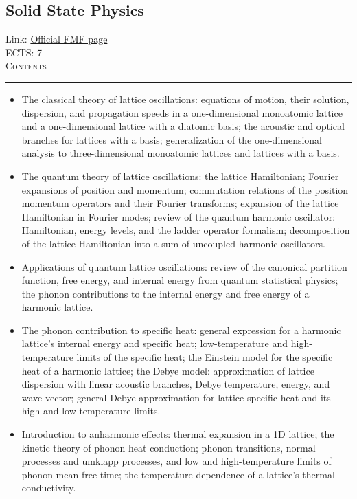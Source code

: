 \documentclass[11pt, a4paper]{article}
\newenvironment{course}[3]{
\subsection{#1}%
Link: \href{#2}{Official FMF page}\\%
ECTS: #3%
\vspace{1ex}
\\
{\large \textsc{Contents}}\\[-0.9ex]%
\rule{\textwidth}{0.5pt}
\vspace{-3ex}
}
{}
\newenvironment{chapter}[1]{
\begin{tcolorbox}[title=#1, breakable]
}
{\end{tcolorbox}}
\begin{document}
\begin{course}{Solid State Physics}{https://www.fmf.uni-lj.si/en/study-physics/programmes/1fiz/2020/7000777/courses/1138/}{7}
    \begin{chapter}{Lattice oscillations}
        \begin{itemize}
        
            \item The classical theory of lattice oscillations: equations of motion, their solution, dispersion, and propagation speeds in a one-dimensional monoatomic lattice and a one-dimensional lattice with a diatomic basis; the acoustic and optical branches for lattices with a basis; generalization of the one-dimensional analysis to three-dimensional monoatomic lattices and lattices with a basis.

            \item The quantum theory of lattice oscillations: the lattice Hamiltonian; Fourier expansions of position and momentum; commutation relations of the position momentum operators and their Fourier transforms; expansion of the lattice Hamiltonian in Fourier modes; review of the quantum harmonic oscillator: Hamiltonian, energy levels, and the ladder operator formalism; decomposition of the lattice Hamiltonian into a sum of uncoupled harmonic oscillators.

            \item Applications of quantum lattice oscillations: review of the canonical partition function, free energy, and internal energy from quantum statistical physics; the phonon contributions to the internal energy and free energy of a harmonic lattice.

            \item The phonon contribution to specific heat: general expression for a harmonic lattice's internal energy and specific heat; low-temperature and high-temperature limits of the specific heat; the Einstein model for the specific heat of a harmonic lattice; the Debye model: approximation of lattice dispersion with linear acoustic branches, Debye temperature, energy, and wave vector; general Debye approximation for lattice specific heat and its high and low-temperature limits.

            \item Introduction to anharmonic effects: thermal expansion in a 1D lattice; the kinetic theory of phonon heat conduction; phonon transitions, normal processes and umklapp processes, and low and high-temperature limits of phonon mean free time; the temperature dependence of a lattice's thermal conductivity.
        
        \end{itemize}
    \end{chapter}
\end{course}
\end{document}
